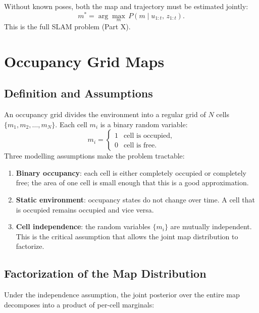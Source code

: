 \documentclass[11pt,a4paper]{article}
\theoremstyle{definition}
\theoremstyle{plain}
\theoremstyle{remark}
\begin{document}
\begin{tcolorbox}[colback=blue!5!white,colframe=blue!75!black,title=\textbf{Mapping without Known Poses (SLAM)}]
Without known poses, both the map and trajectory must be estimated jointly:
\[
    m^* = \arg\max_{m}\, P(m \mid u_{1:t},\, z_{1:t}).
\]
This is the full SLAM problem (Part X).
\end{tcolorbox}

\section{Occupancy Grid Maps}

\subsection{Definition and Assumptions}

An occupancy grid divides the environment into a regular grid of $N$ cells $\{m_1, m_2, \ldots, m_N\}$. Each cell $m_i$ is a binary random variable:
\[
    m_i = \begin{cases} 1 & \text{cell is occupied,} \\ 0 & \text{cell is free.} \end{cases}
\]
Three modelling assumptions make the problem tractable:

\begin{enumerate}
    \item \textbf{Binary occupancy}: each cell is either completely occupied or completely free; the area of one cell is small enough that this is a good approximation.
    \item \textbf{Static environment}: occupancy states do not change over time. A cell that is occupied remains occupied and vice versa.
    \item \textbf{Cell independence}: the random variables $\{m_i\}$ are mutually independent. This is the critical assumption that allows the joint map distribution to factorize.
\end{enumerate}

\subsection{Factorization of the Map Distribution}

Under the independence assumption, the joint posterior over the entire map decomposes into a product of per-cell marginals:
\end{document}
